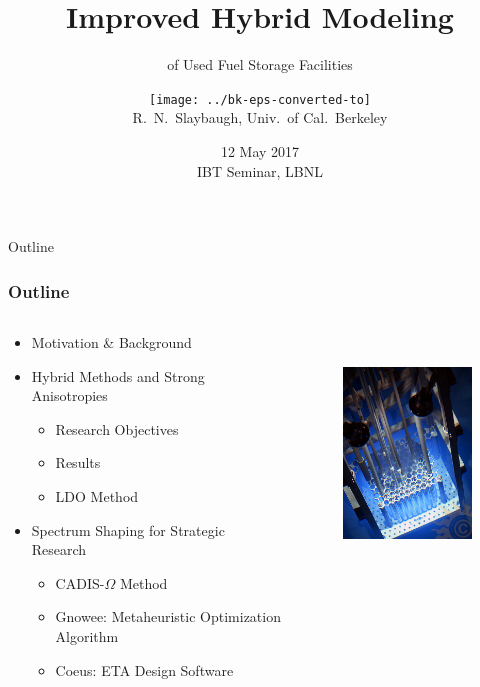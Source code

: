\documentclass[xcolor=x11names,compress,handout]{beamer}
\title{Improved Hybrid Modeling}
\subtitle{of Used Fuel Storage Facilities}
\author{\texttt{[image: ../bk-eps-converted-to]}\\R.\ N.\ Slaybaugh, Univ.\ of Cal.\ Berkeley
}
\date{12 May 2017 \\ IBT Seminar, LBNL}
\renewcommand{\(}{\begin{columns}}
\renewcommand{\)}{\end{columns}}
\newcommand{\<}[1]{\begin{column}{#1}}
\renewcommand{\>}{\end{column}}
\begin{document}
\begin{frame}
\titlepage
\end{frame}

\begin{frame}[fragile]{Outline}
  \frametitle{Outline}

\begin{columns}
  \begin{column}{0.5\textwidth}
    \begin{itemize}
    \item Motivation \& Background
    \vspace*{.75em}
    \item Hybrid Methods and Strong Anisotropies
        \begin{itemize}
        \item Research Objectives
	\item Results
	\item LDO Method
        \end{itemize}
        
   \vspace*{.75em}
   \item Spectrum Shaping for Strategic Research
        \begin{itemize}
        \item CADIS-$\Omega$ Method
	\item Gnowee: Metaheuristic Optimization Algorithm
	\item Coeus: ETA Design Software
        \end{itemize}	
  \end{itemize}
  \end{column}
  \begin{column}{0.5\textwidth}
  	\begin{figure}
  	\begin{center}
  		\includegraphics[height=2.5in,clip]{../figs/psu-reactor}
	\end{center}
  	\end{figure}
  \end{column}
\end{columns}

\end{frame}
\end{document}
